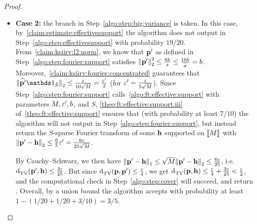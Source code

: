 \begin{proof}
\begin{itemize}
\item\textbf{Case 2:} the branch in Step~\ref{algo:step:big:variance} is taken.
In this case, by~\cref{claim:estimate:effectivesupport} the algorithm does not output \reject in Step~\ref{algo:step:effectivesupport} with probability $19/20$. From~\cref{claim:ksiirv:l2:norm}, we know that $\mathbf{p}'$ as defined in Step~\ref{algo:step:fourier:support} satisfies ${\lVert\mathbf{p}'{\rVert}}_2^2 \leq \frac{8k}{s}\leq \frac{16k}{\widetilde{\sigma}} = b$.  Moreover,~\cref{claim:ksiirv:fourier:concentrated} guarantees that $\normtwo{\fourier{\p'}\indicSet{\bar{S}}} \leq \frac{\eps}{10\sqrt{M}} = \frac{\eps'}{2}$ (for $\varepsilon' = \frac{\varepsilon}{5\sqrt{M}}$). Since Step~\ref{algo:step:fourier:support} calls~\cref{algo:ft:effective:support} with parameters $M, \varepsilon', b$, and $S$, \cref{theo:ft:effective:support:iii} of~\cref{theo:ft:effective:support} ensures that (with probability at least $7/10$) the algorithm will not output \reject in Step~\ref{algo:step:fourier:support}, but instead return the $S$-sparse Fourier transform of some $\mathbf{h}$ supported on $\llbracket M\rrbracket$ with ${\lVert\mathbf{p}'-\mathbf{h}{\rVert}}_2 \leq \frac{6}{5}\varepsilon' = \frac{6\varepsilon}{25\sqrt{M}}$. 

By Cauchy--Schwarz, we then have ${\lVert\mathbf{p}'-\mathbf{h}{\rVert}}_1 \leq \sqrt{M}{\lVert\mathbf{p}'-\mathbf{h}{\rVert}}_2 \leq \frac{6\varepsilon}{25}$, i.e. ${\operatorname{d}_{\rm{TV}}^{}\!\left({\mathbf{p}', \mathbf{h}}\right)} \leq \frac{3\varepsilon}{25}$. But since
${\operatorname{d}_{\rm{TV}}^{}\!\left({\mathbf{p}, \mathbf{p}'}\right)} \leq \frac{\varepsilon}{4}$, we get ${\operatorname{d}_{\rm{TV}}^{}\!\left({\mathbf{p}, \mathbf{h}}\right)} \leq \frac{\varepsilon}{4}+\frac{3\varepsilon}{25} < \frac{\varepsilon}{2}$, and the computational check in Step~\ref{algo:step:cover} will succeed, and return \accept.
Overall, by a union bound the algorithm accepts with probability at least $1-(1/20+1/20+3/10)=3/5$.
\end{itemize}
\end{proof}

